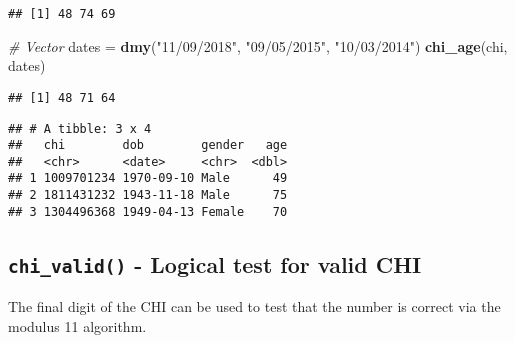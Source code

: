 \documentclass[]{book}
\newenvironment{Shaded}{\begin{snugshade}}{\end{snugshade}}
\newcommand{\CommentTok}[1]{\textcolor[rgb]{0.56,0.35,0.01}{\textit{#1}}}
\newcommand{\DataTypeTok}[1]{\textcolor[rgb]{0.13,0.29,0.53}{#1}}
\newcommand{\KeywordTok}[1]{\textcolor[rgb]{0.13,0.29,0.53}{\textbf{#1}}}
\newcommand{\NormalTok}[1]{#1}
\newcommand{\OperatorTok}[1]{\textcolor[rgb]{0.81,0.36,0.00}{\textbf{#1}}}
\newcommand{\StringTok}[1]{\textcolor[rgb]{0.31,0.60,0.02}{#1}}
\begin{document}
\begin{verbatim}
## [1] 48 74 69
\end{verbatim}

\begin{Shaded}
\begin{Highlighting}[]
\CommentTok{# Vector}
\NormalTok{dates =}\StringTok{ }\KeywordTok{dmy}\NormalTok{(}\StringTok{"11/09/2018"}\NormalTok{,}
            \StringTok{"09/05/2015"}\NormalTok{,}
            \StringTok{"10/03/2014"}\NormalTok{)}
\KeywordTok{chi_age}\NormalTok{(chi, dates)}
\end{Highlighting}
\end{Shaded}

\begin{verbatim}
## [1] 48 71 64
\end{verbatim}

\begin{Shaded}
\end{Shaded}

\begin{verbatim}
## # A tibble: 3 x 4
##   chi        dob        gender   age
##   <chr>      <date>     <chr>  <dbl>
## 1 1009701234 1970-09-10 Male      49
## 2 1811431232 1943-11-18 Male      75
## 3 1304496368 1949-04-13 Female    70
\end{verbatim}

\hypertarget{chi_valid---logical-test-for-valid-chi}{%
\subsection{\texorpdfstring{\texttt{chi\_valid()} - Logical test for valid CHI}{chi\_valid() - Logical test for valid CHI}}\label{chi_valid---logical-test-for-valid-chi}}

The final digit of the CHI can be used to test that the number is correct via the modulus 11 algorithm.
\end{document}
